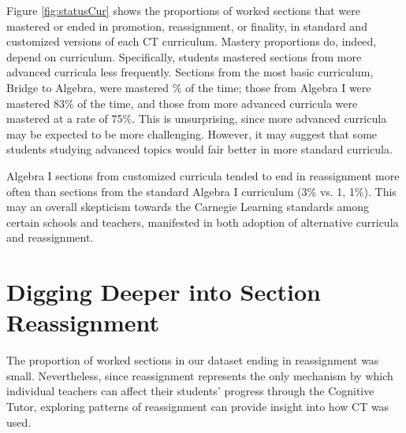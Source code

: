 \documentclass[12pt]{article}\usepackage[]{graphicx}\usepackage[]{color}
\begin{document}
Figure \ref{fig:statusCur} shows the proportions of worked sections
that were mastered or ended in promotion, reassignment, or finality, in
standard and customized versions of each CT curriculum.
Mastery proportions do, indeed, depend on curriculum.
Specifically, students mastered sections from more advanced curricula
less frequently.
Sections from the most basic curriculum, Bridge to Algebra, were
mastered
\% of the time;
those from Algebra I were mastered
83\%
of the time, and those from more advanced curricula were mastered
at a rate of
75\%.
This is unsurprising, since more advanced curricula may be expected
to be more challenging.
However, it may suggest that some students studying advanced topics
would fair better in more standard curricula.

Algebra I sections from customized curricula tended to end in
reassignment more often than sections from the standard Algebra I
curriculum (3\% vs.
1, 1\%).
This may an overall skepticism towards the Carnegie Learning standards
among certain schools and teachers, manifested in both adoption of
alternative curricula and reassignment.%




\section{Digging Deeper into Section Reassignment}\label{sec:cp}
The proportion of worked sections in our dataset ending in
reassignment was small.
Nevertheless, since reassignment represents the only mechanism by
which individual teachers can affect their students' progress through
the Cognitive Tutor, exploring patterns of reassignment can provide
insight into how CT was used.
\end{document}
